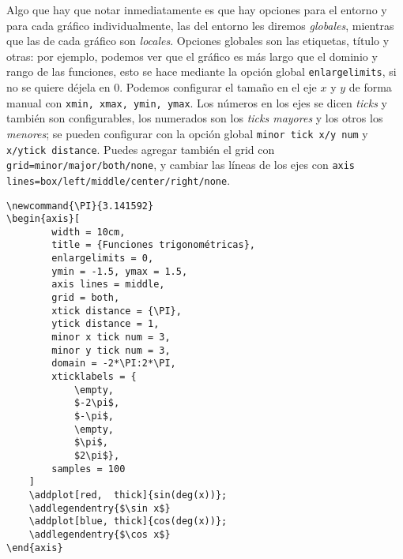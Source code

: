 Algo que hay que notar inmediatamente es que hay opciones para el entorno y para cada gráfico individualmente, las del entorno les diremos \textit{globales}, mientras que las de cada gráfico son \textit{locales}. Opciones globales son las etiquetas, título y otras: por ejemplo, podemos ver que el gráfico es más largo que el dominio y rango de las funciones, esto se hace mediante la opción global \texttt{enlargelimits}, si no se quiere déjela en 0. Podemos configurar el tamaño en el eje $x$ y $y$ de forma manual con \texttt{xmin, xmax, ymin, ymax}. Los números en los ejes se dicen \textit{ticks} y también son configurables, los numerados son los \textit{ticks mayores} y los otros los \textit{menores}; se pueden configurar con la opción global \texttt{minor tick x/y num} y \texttt{x/ytick distance}. Puedes agregar también el grid con \texttt{grid=minor/major/both/none}, y cambiar las líneas de los ejes con \texttt{axis lines=box/left/middle/center/right/none}.
\begin{lstlisting}[basicstyle=\footnotesize\ttfamily]
\newcommand{\PI}{3.141592}
\begin{axis}[
		width = 10cm,
		title = {Funciones trigonométricas},
		enlargelimits = 0,
		ymin = -1.5, ymax = 1.5,
		axis lines = middle,
		grid = both,
		xtick distance = {\PI},
		ytick distance = 1,
		minor x tick num = 3,
		minor y tick num = 3,
		domain = -2*\PI:2*\PI,
		xticklabels = {
			\empty,
			$-2\pi$,
			$-\pi$,
			\empty,
			$\pi$,
			$2\pi$},
		samples = 100
	]
	\addplot[red,  thick]{sin(deg(x))};
	\addlegendentry{$\sin x$}
	\addplot[blue, thick]{cos(deg(x))};
	\addlegendentry{$\cos x$}
\end{axis}
\end{lstlisting}
\begin{figure}[!h]
	\centering
\end{figure}

